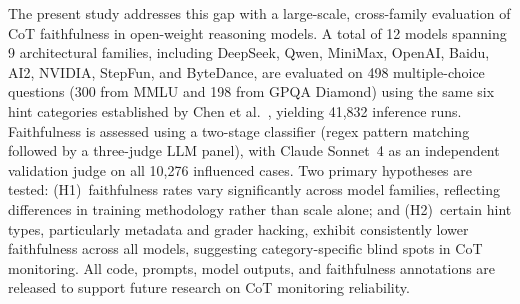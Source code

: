 The present study addresses this gap with a large-scale, cross-family
evaluation of CoT faithfulness in open-weight reasoning models. A total of 12
models spanning 9 architectural families, including DeepSeek, Qwen,
MiniMax, OpenAI, Baidu, AI2, NVIDIA, StepFun, and
ByteDance, are evaluated on 498
multiple-choice questions (300 from MMLU and 198 from GPQA Diamond) using the
same six hint categories established by Chen et al.~\cite{chen2025reasoning},
yielding 41,832 inference runs. Faithfulness is assessed using a two-stage
classifier (regex pattern matching followed by a three-judge LLM panel),
with Claude Sonnet~4 as an independent validation judge on all 10,276
influenced cases. Two primary hypotheses
are tested: (H1)~faithfulness rates vary significantly across model families,
reflecting differences in training methodology rather than scale alone; and
(H2)~certain hint types, particularly metadata and grader
hacking, exhibit consistently lower faithfulness across all models, suggesting
category-specific blind spots in CoT monitoring. All code, prompts, model outputs, and faithfulness
annotations are released to support future research on CoT monitoring
reliability.
